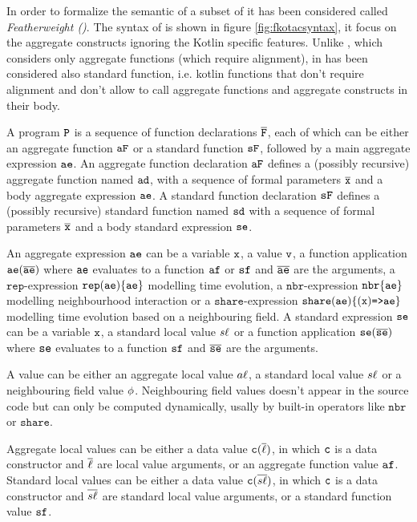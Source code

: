 In order to formalize the semantic of \Kotac{} a subset of it has been considered called \textit{Featherweight \Kotac{} (\FKotac{})}. The syntax of \FKotac is shown in figure \ref{fig:fkotacsyntax}, it focus on the aggregate constructs ignoring the Kotlin specific features. Unlike \FSCAFI, which considers only aggregate functions (which require alignment), in \FKotac has been considered also standard function, i.e. kotlin functions that don't require alignment and don't allow to call aggregate functions and aggregate constructs in their body. 

A program $\mathtt{P}$ is a sequence of function declarations $\overline{\mathtt{F}}$, each of which can be either an aggregate function $\mathtt{aF}$ or a standard function $\mathtt{sF}$, followed by a main aggregate expression $\mathtt{ae}$. An aggregate function declaration $\mathtt{aF}$ defines a (possibly recursive) aggregate function named $\mathtt{ad}$, with a sequence of formal parameters $\overline{\mathtt{x}}$ and a body aggregate expression $\mathtt{ae}$. A standard function declaration $\mathtt{sF}$ defines a (possibly recursive) standard function named $\mathtt{sd}$ with a sequence of formal parameters $\overline{\mathtt{x}}$ and a body standard expression $\mathtt{se}$. 

An aggregate expression $\mathtt{ae}$ can be a variable $\mathtt{x}$, a value $\mathtt{v}$, a function application $\mathtt{ae}(\overline{\mathtt{ae}})$ where $\mathtt{ae}$ evaluates to a function $\mathtt{af}$ or $\mathtt{sf}$ and $\overline{\mathtt{ae}}$ are the arguments, a $\mathtt{rep}$-expression $\mathtt{rep}(\mathtt{ae})\{ \mathtt{ae} \}$ modelling time evolution, a $\mathtt{nbr}$-expression $\mathtt{nbr}\{\mathtt{ae}\}$ modelling neighbourhood interaction or a $\mathtt{share}$-expression $\mathtt{share}(\mathtt{ae})\{(\mathtt{x}) \mathrm{ \texttt{=>}\mathtt{ae} } \}$ modelling time evolution based on a neighbouring field. A standard expression $\mathtt{se}$ can be a variable $\mathtt{x}$, a standard local value $s\ell$ or a function application $\mathtt{se}(\overline{\mathtt{se}})$ where $\mathtt{se}$ evaluates to a function $\mathtt{sf}$ and $\overline{\mathtt{se}}$ are the arguments.

A value can be either an aggregate local value $a\ell$, a standard local value $s\ell$ or a neighbouring field value $\phi$. Neighbouring field values doesn't appear in the source code but can only be computed dynamically, usally by built-in operators like $\mathtt{nbr}$ or $\mathtt{share}$.

Aggregate local values can be either a data value $\mathtt{c}(\overline{\ell})$, in which $\mathtt{c}$ is a data constructor and $\overline{\ell}$ are local value arguments, or an aggregate function value $\mathtt{af}$. Standard local values can be either a data value $\mathtt{c}(\overline{s\ell})$, in which $\mathtt{c}$ is a data constructor and $\overline{s\ell}$ are standard local value arguments, or a standard function value $\mathtt{sf}$.

